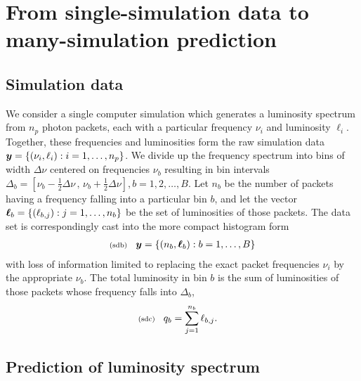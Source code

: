 \documentclass[11pt]{article}
\newcommand{\lleq}[1]{\label{#1} }
\renewcommand{\lleq}[1]{\label{#1} {\scriptstyle {\rm (#1)}} \hspace*{2ex} }
\newcommand{\npack}{{n_p}}
\newcommand{\lumtot}{q}
\newcommand{\lum}{\ell}
\begin{document}
\section{From single-simulation data to many-simulation prediction}

\subsection{Simulation data}

We consider a single computer simulation which generates a luminosity
spectrum from $\npack$ photon packets, each with a particular
frequency $\nu_i$ and luminosity $\lum_i$. Together, these frequencies
and luminosities form the raw simulation data
$\bmy = \{ (\nu_i,\lum_i): i = 1,\ldots,\npack\}$.  We divide up the
frequency spectrum into bins of width $\Delta\nu$ centered on
frequencies $\nu_b$ resulting in bin intervals
$\Delta_b = [\nu_b {-} \tfrac{1}{2} \Delta\nu \,,\, \nu_b {+}
\tfrac{1}{2} \Delta\nu], b = 1,2,\ldots, B$. Let $n_b$ be the number
of packets having a frequency falling into a particular bin $b$, and
let the vector ${\bm{\ell}}_b = \{(\ell_{b,j}): j = 1,\ldots,n_b\}$ be the
set of luminosities of those packets. The data set is correspondingly
cast into the more compact histogram form
\begin{align}
  \lleq{sdb}
  \bmy = \{(n_b,\bml_b): b = 1,\ldots,B\}
\end{align}
with loss of information limited to replacing the exact packet
frequencies $\nu_i$ by the appropriate $\nu_b$. The total luminosity
in bin $b$ is the sum of luminosities of those packets whose frequency
falls into $\Delta_b$,
\begin{align}
  \lleq{sdc}
  \lumtot_b 
  &= \sum_{j=1}^{n_b} \lum_{b,j}.
\end{align}

\subsection{Prediction of luminosity spectrum}
\end{document}

